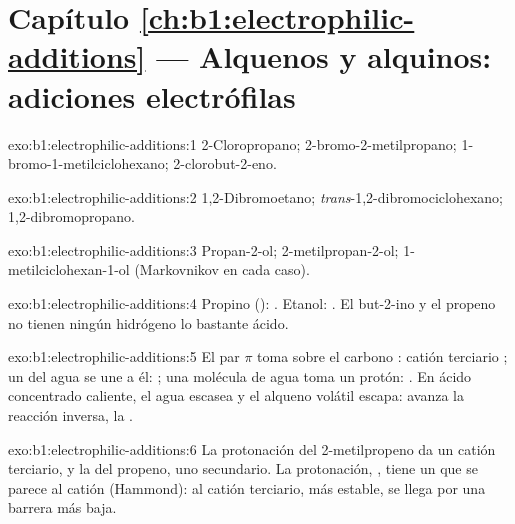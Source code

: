 \section*{Capítulo \ref{ch:b1:electrophilic-additions} --- Alquenos y alquinos: adiciones electrófilas}

\begin{solution}{exo:b1:electrophilic-additions:1}
2-Cloropropano; 2-bromo-2-metilpropano; 1-bromo-1-metilciclohexano;
2-clorobut-2-eno.
\end{solution}

\begin{solution}{exo:b1:electrophilic-additions:2}
1,2-Dibromoetano; \textit{trans}-1,2-dibromociclohexano;
1,2-dibromopropano.
\end{solution}

\begin{solution}{exo:b1:electrophilic-additions:3}
Propan-2-ol; 2-metilpropan-2-ol; 1-metilciclohexan-1-ol (Markovnikov en
cada caso).
\end{solution}

\begin{solution}{exo:b1:electrophilic-additions:4}
Propino (): . Etanol:
. El but-2-ino y el propeno no
tienen ningún hidrógeno lo bastante ácido.
\end{solution}

\begin{solution}{exo:b1:electrophilic-additions:5}
El par $\pi$ toma  sobre el carbono : catión terciario
; un  del agua se une a él:
; una molécula de agua toma un protón: . En
ácido concentrado caliente, el agua escasea y el alqueno volátil escapa:
avanza la reacción inversa, la .
\end{solution}

\begin{solution}{exo:b1:electrophilic-additions:6}
La protonación del 2-metilpropeno da un catión terciario, y la del
propeno, uno secundario. La protonación, , tiene un  que se parece al catión
(Hammond): al catión terciario, más estable, se llega por una barrera más
baja.
\end{solution}

